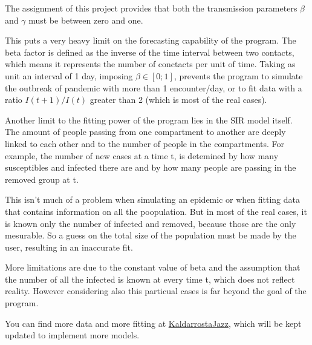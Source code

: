 The assignment of this project provides that both the transmission parameters $\beta$ and $\gamma$ must be  between zero and one.

This puts a very heavy limit on the forecasting capability of the program. The beta factor is defined as the inverse of the time interval between two contacts, which means it represents the number of conctacts per unit of time. Taking as unit an interval of 1 day, imposing $\beta \in [0; 1]$, prevents the program to simulate the outbreak of pandemic with more than 1 encounter/day, or to fit data with a ratio $I(t+1)/I(t)$ greater than 2 (which is most of the real cases).

Another limit to the fitting power of the program lies in the SIR model itself. The amount of people passing from one compartment to another are deeply linked to each other and to the number of people in the compartments. For example, the number of new cases  at a time t, is detemined by how many susceptibles and infected there are and by how many people are passing in the removed group at t.

This isn't much of a problem when simulating an epidemic or when fitting  data that contains information on all the poopulation. But in most of the real cases, it is known only the number of infected and removed, because those are the only mesurable. So a guess on the total size of the population  must be made by the user, resulting in an inaccurate fit.

More limitations are due to the constant value of beta and the assumption that the number of all the infected is known at every time t, which does not reflect reality. However considering also this particual cases is far beyond the goal of the program.

You can find more data and more fitting at  \href{https://github.com/KaldarrostaJazz/pandemic_models}{KaldarrostaJazz}, which will be  kept updated to implement more models.

